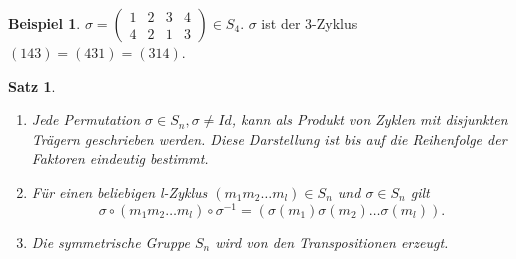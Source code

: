 \documentclass[12pt]{scrartcl}%
\newtheorem{thm}{Satz}
\theoremstyle{definition}
\newtheorem{ex}{Beispiel}
\theoremstyle{remark}
\begin{document}
\begin{ex}
     $\sigma = \begin{pmatrix}
     1 & 2 & 3 & 4 \\
     4 & 2 & 1 & 3 \end{pmatrix} \in S_4$.
    $\sigma$ ist der 3-Zyklus $(143) = (431) = (314)$.
\end{ex}


\begin{thm}
\begin{enumerate}[label=(\alph*)]
    \item Jede Permutation $\sigma\in S_n, \sigma\neq Id$, kann als Produkt von Zyklen mit disjunkten Trägern geschrieben werden. Diese Darstellung ist bis auf die Reihenfolge der Faktoren eindeutig bestimmt.
    \item Für einen beliebigen l-Zyklus $(m_1m_2\dots m_l)\in S_n$ und $\sigma\in S_n$ gilt 
    \[\sigma\circ(m_1m_2\dots m_l)\circ\sigma^{-1} = (\sigma(m_1)\sigma(m_2)\dots\sigma(m_l)).\]
    \item Die symmetrische Gruppe $S_n$ wird von den Transpositionen erzeugt.
\end{enumerate}
\end{thm}
\end{document}

